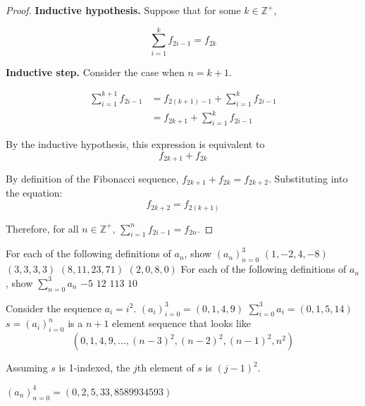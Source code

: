 \documentclass{article}
\numberwithin{subcase}{case}
\begin{document}
\begin{outline}[enumerate]
\begin{proof}
        \textbf{Inductive hypothesis.} Suppose that for some $k \in \mathbb{Z}^+$,

        \begin{equation}
            \sum^{k}_{i=1} f_{2i-1} = f_{2k}
        \end{equation}

        \textbf{Inductive step.} Consider the case when $n = k + 1$.

        \begin{equation}
            \begin{aligned}
                \sum^{k+1}_{i=1} f_{2i-1} &= f_{2(k+1)-1} + \sum^{k}_{i=1} f_{2i-1} \\
                &= f_{2k+1} + \sum^{k}_{i=1} f_{2i-1}
            \end{aligned}
        \end{equation}

        By the inductive hypothesis, this expression is equivalent to
        \begin{equation}
            f_{2k+1} + f_{2k}
        \end{equation}

        By definition of the Fibonacci sequence, $f_{2k+1} + f_{2k} = f_{2k+2}$. Substituting into 
        the equation:
        \begin{equation}
            f_{2k+2} = f_{2(k+1)}
        \end{equation}

        Therefore, for all $n \in \mathbb{Z}^+$, $\sum^{n}_{i=1} f_{2i-1} = f_{2n}$.

    \end{proof}

    \1 For each of the following definitions of $a_n$, show $(a_n)^3_{n=0}$
        \2 $(1, -2, 4, -8)$
        \2 $(3, 3, 3, 3)$
        \2 $(8, 11, 23, 71)$
        \2 $(2, 0, 8, 0)$
    \1 For each of the following definitions of $a_n$, show $\sum^3_{n=0}a_n$
        \2 $-5$
        \2 $12$
        \2 $113$
        \2 $10$

    \1 Consider the sequence $a_i = i^2$.
        \2 $(a_i)^3_{i=0} = (0, 1, 4, 9)$
        \2 $\sum^3_{i=0} a_i = (0, 1, 5, 14)$
        \2 $s = (a_i)^n_{i=0}$ is a $n + 1$ element sequence that looks like
        $$(0, 1, 4, 9, \dots, (n-3)^2, (n-2)^2, (n-1)^2, n^2)$$
        
        Assuming $s$ is 1-indexed, the $j$th element of $s$ is $(j-1)^2$.

    \1 $(a_n)^4_{n=0} = (0, 2, 5, 33, 8589934593)$


\end{outline}
\end{document}
